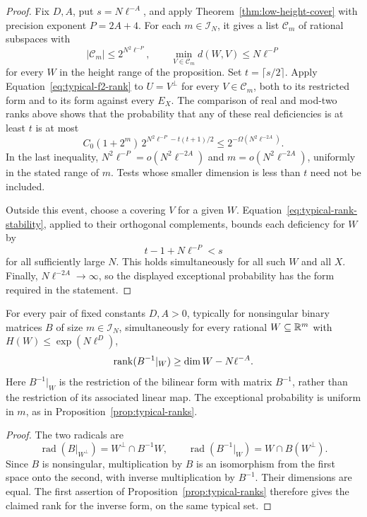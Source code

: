 \begin{proof}
Fix \(D,A\), put \(s=N\ell^{-A}\), and apply
Theorem~\ref{thm:low-height-cover} with precision exponent
\(P=2A+4\). For each \(m\in\mathcal I_N\), it gives a list
\(\mathcal C_m\) of rational subspaces with
\[
 |\mathcal C_m|\le 2^{N^2\ell^{-P}},\qquad
 \min_{V\in\mathcal C_m}d(W,V)\le N\ell^{-P}
\]
for every \(W\) in the height range of the proposition. Set
\(t=\lceil s/2\rceil\). Apply Equation~\eqref{eq:typical-f2-rank}
to \(U=V^\perp\) for every \(V\in\mathcal C_m\), both to its
restricted form and to its form against every \(E_X\). The comparison
of real and mod-two ranks above shows that the probability that any
of these real deficiencies is at least \(t\) is at most
\[
 C_0(1+2^m)\,2^{N^2\ell^{-P}-t(t+1)/2}
 \le 2^{-\Omega(N^2\ell^{-2A})}.
\]
In the last inequality, \(N^2\ell^{-P}=o(N^2\ell^{-2A})\) and
\(m=o(N^2\ell^{-2A})\), uniformly in the stated range of \(m\).
Tests whose smaller dimension is less than \(t\) need not be included.

Outside this event, choose a covering \(V\) for a given \(W\).
Equation~\eqref{eq:typical-rank-stability}, applied to their
orthogonal complements, bounds each deficiency for \(W\) by
\[
 t-1+N\ell^{-P}<s
\]
for all sufficiently large \(N\). This holds simultaneously for
all such \(W\) and all \(X\). Finally,
\(N\ell^{-2A}\to\infty\), so the displayed exceptional probability
has the form required in the statement.
\end{proof}

\begin{corollary}\label{cor:inverse-rank}
For every pair of fixed constants \(D,A>0\), typically for nonsingular
binary matrices \(B\) of size \(m\in\mathcal I_N\), simultaneously
for every rational \(W\subseteq\mathbb R^m\) with
\(H(W)\le\exp(N\ell^D)\),
\[
 \operatorname{rank}(B^{-1}|_W)\ge\dim W-N\ell^{-A}.
\]
Here \(B^{-1}|_W\) is the restriction of the bilinear form with matrix
\(B^{-1}\), rather than the restriction of its associated linear map.
The exceptional probability is uniform in \(m\), as in
Proposition~\ref{prop:typical-ranks}.
\end{corollary}

\begin{proof}
The two radicals are
\[
 \operatorname{rad}(B|_{W^\perp})
   =W^\perp\cap B^{-1}W,
 \qquad
 \operatorname{rad}(B^{-1}|_W)
   =W\cap B(W^\perp).
\]
Since \(B\) is nonsingular, multiplication by \(B\) is an
isomorphism from the first space onto the second, with inverse
multiplication by \(B^{-1}\). Their dimensions are equal. The first
assertion of Proposition~\ref{prop:typical-ranks} therefore gives the
claimed rank for the inverse form, on the same typical set.
\end{proof}

